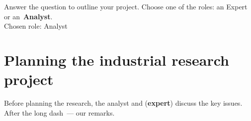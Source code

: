 \documentclass[12pt]{article}
\date{}
\begin{document}
\maketitle

Answer the question to outline your project. Choose one of the roles: an {Expert} or an~\textbf{Analyst}.\\
Chosen role: Analyst


\section{Planning the industrial research project}
Before planning the research, the analyst and (\textbf{expert}) discuss the key issues. After the long dash~--- our remarks.
\end{document}
